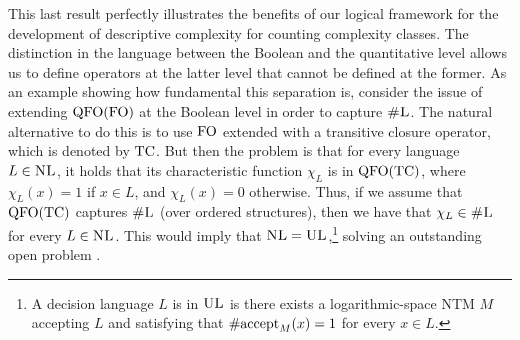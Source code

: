 This last result 
perfectly 
illustrates the benefits of our logical framework for the development of descriptive complexity for counting %
complexity classes.  
The distinction in the language between the Boolean and the quantitative level allows us to define operators at the latter level that cannot be defined at the former. 
As an example showing how fundamental this separation is, consider the issue of extending ${\rm QFO}({\rm FO})$ at the Boolean level in order to capture $\text{\sc \#L}$. The natural alternative to do this is to use ${\rm FO}$ extended with a transitive closure operator, which is denoted by ${\rm TC}$. But then the problem is that for every language $L \in \text{\sc NL}$, it holds that its characteristic function $\chi_L$ is in ${\rm QFO}({\rm TC})$, where $\chi_L(x) = 1$ if $x \in L$, and $\chi_L(x) = 0$ otherwise. Thus, if we assume that ${\rm QFO}({\rm TC})$ captures $\text{\sc \#L}$ (over ordered structures), then we have that $\chi_L \in \text{\sc \#L}$ for every $L \in \text{\sc NL}$. This would imply that $\text{\sc NL} = \text{\sc UL}$,\footnote{A decision language $L$ is in $\text{\sc UL}$ is there exists a logarithmic-space NTM $M$ accepting $L$ and satisfying that $\text{\rm \#accept}_M(x) = 1$ for every $x \in L$.} solving an outstanding open problem \cite{Reinhardt97}.
